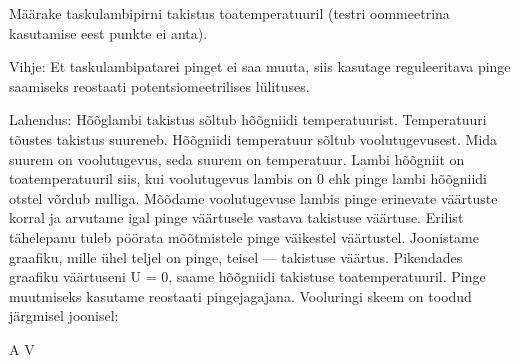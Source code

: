 
Määrake taskulambipirni takistus toatemperatuuril (testri oommeetrina kasutamise eest punkte ei anta).

\hint

\solu
Vihje: Et taskulambipatarei pinget ei saa muuta, siis kasutage reguleeritava pinge saamiseks reostaati potentsiomeetrilises lülituses.

Lahendus: Hõõglambi takistus sõltub hõõgniidi temperatuurist. Temperatuuri tõustes takistus suureneb. Hõõgniidi temperatuur sõltub voolutugevusest. Mida suurem on voolutugevus, seda suurem on temperatuur. Lambi hõõgniit on toatemperatuuril siis, kui voolutugevus lambis on 0 ehk pinge lambi hõõgniidi otstel võrdub nulliga. Mõõdame voolutugevuse lambis pinge erinevate väärtuste korral ja arvutame igal pinge väärtusele vastava takistuse väärtuse. Erilist tähelepanu tuleb pöörata mõõtmistele pinge väikestel väärtustel. Joonistame graafiku, mille ühel teljel on pinge, teisel --- takistuse väärtus. Pikendades graafiku väärtuseni U = 0, saame hõõgniidi takistuse toatemperatuuril. Pinge muutmiseks kasutame reostaati pingejagajana. Vooluringi skeem on toodud järgmisel joonisel:

A V
\probend
